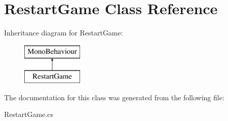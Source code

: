 \hypertarget{class_restart_game}{}\section{Restart\+Game Class Reference}
\label{class_restart_game}
Inheritance diagram for Restart\+Game\+:\begin{figure}[H]
\begin{center}
\leavevmode
\includegraphics[height=2.000000cm]{class_restart_game}
\end{center}
\end{figure}


The documentation for this class was generated from the following file\+:\begin{DoxyCompactItemize}
\item 
Restart\+Game.\+cs\end{DoxyCompactItemize}
